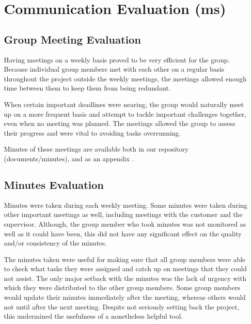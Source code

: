 \section{Communication Evaluation (ms)}
\label{evaluation communication}

\subsection{Group Meeting Evaluation}

Having meetings on a weekly basis proved to be very efficient
for the group. Because individual group members met with 
each other on a regular basis throughout the project outside
the weekly meetings, the meetings allowed enough time 
between them to keep them from being redundant.

When certain important deadlines were nearing, the group
would naturally meet up on a more frequent basis and
attempt to tackle important challenges together, even when
no meeting was planned. The meetings allowed the group 
to assess their progress and were vital to avoiding tasks
overrunning.

Minutes of these meetings are available both in our repository \cite{github} 
(documents/minutes), and as an appendix \cite{chap:meeting_minutes}.

\subsection{Minutes Evaluation}

Minutes were taken during each weekly meeting. 
Some minutes were taken during other important meetings 
as well, including meetings with the customer and the 
supervisor. Although, the group member who took 
minutes was not monitored as well as it could have been, 
this did not have any significant effect on the quality 
and/or consistency of the minutes.

The minutes taken were useful for making sure that
all group members were able to check what tasks
they were assigned and catch up on meetings that they
could not assist. The only major setback with the minutes
was the lack of urgency with which they were distributed
to the other group members. Some group members would
update their minutes immediately after the meeting, whereas 
others would not until after the next meeting. Despite
not seriously setting back the project, this undermined the
usefulness of a nonetheless helpful tool.

